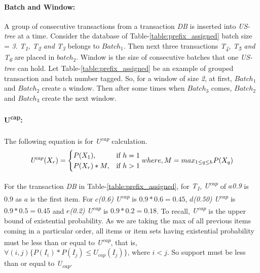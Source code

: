 \documentclass[conference]{IEEEtran}
\begin{document}
    \paragraph{Batch and Window:}
A group of consecutive transactions from a transaction \emph{DB} is inserted into \emph{US-tree} at a time. Consider the database of Table-\ref{table:prefix_assigned} batch size = \emph{3}. \emph{T\textsubscript{1}, T\textsubscript{2} and T\textsubscript{3}} belongs to $Batch_{1}$. Then next three transactions \emph{T\textsubscript{4}, T\textsubscript{5} and T\textsubscript{6}} are placed in $batch_{2}$. Window is the size of consecutive batches that one \emph{US-tree} can hold. Let Table-\ref{table:prefix_assigned} be an example of grouped transaction and batch number tagged. So, for a window of size \emph{2}, at first, $Batch_1$ and $Batch_2$ create a window. Then after some times when $Batch_3$ comes, $Batch_2$ and $Batch_3$ create the next window.
    
    \paragraph{U\textsuperscript{cap}: }
    The following equation is for \emph{U\textsuperscript{cap}} calculation.
	{\footnotesize
    \begin{equation}\label{equation:cap}
	\text{\emph{U\textsuperscript{cap}}}(X_r) =\begin{cases}
				P(X_1), & \text{if $ h = 1$}\\
				P(X_r)*M, & \text{if $ h > 1$}
             
		\end{cases}
where,\\ M=max_{1\leq q\leq h}P(X_q)
\end{equation}}

For the transaction \emph{DB} in Table-\ref{table:prefix_assigned}, for \emph{T\textsubscript{1}}, \emph{U\textsuperscript{cap}} of \emph{$a${0.9}} is $0.9$ as $a$ is the first item. For \emph{$c$(0.6)} \emph{U\textsuperscript{cap}} is $0.9*0.6=0.45$, \emph{$d$(0.50)} \emph{U\textsuperscript{cap}} is $0.9*0.5=0.45$ and \emph{$e$(0.2)} \emph{U\textsuperscript{cap}} is $0.9*0.2=0.18$. To recall, \emph{U\textsuperscript{cap}} is the upper bound of existential probability. As we are taking the max of all previous items coming in a particular order, all items or item sets having existential probability must be less than or equal to \emph{U\textsuperscript{cap}}, that is, $\forall(i,j)\{ P(I_i)*P(I_j)\leq U_{cap}(I_j)\}$, where $i < j$. So support must be less than or equal to \emph{U\textsubscript{cap}}.
\end{document}
